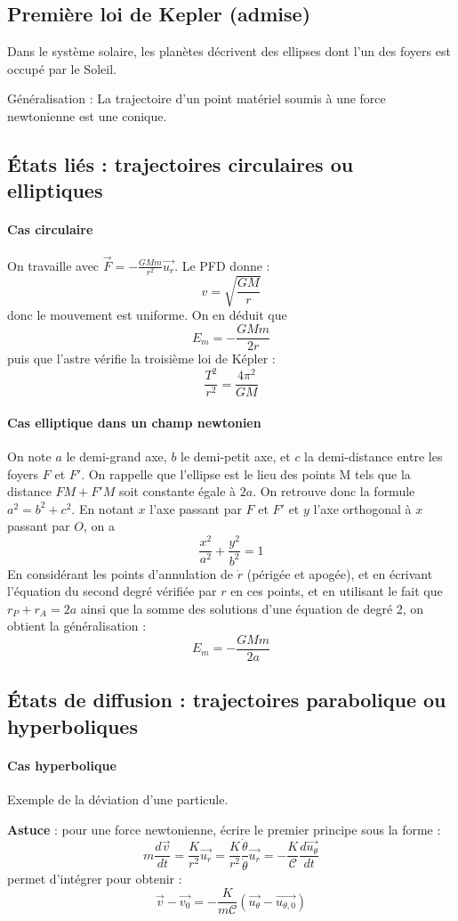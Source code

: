 \documentclass[french]{book}
\theoremstyle{plain}
\theoremstyle{definition}
\theoremstyle{remark}
\begin{document}
\subsection{Première loi de Kepler (admise)}
Dans le système solaire, les planètes décrivent des ellipses dont l'un des foyers est occupé par le Soleil. \\ \par Généralisation : La trajectoire d'un point matériel soumis à une force newtonienne est une conique.
\subsection{États liés : trajectoires circulaires ou elliptiques}
\paragraph{Cas circulaire}On travaille avec $\overrightarrow{F}=-\displaystyle\frac{GMm}{r^2}\overrightarrow{u_r}$. Le PFD donne : $$v=\sqrt{\frac{GM}{r}}$$ donc le mouvement est uniforme. On en déduit que $$E_m=-\frac{GMm}{2r}$$ puis que l'astre vérifie la troisième loi de Képler : $$\frac{T^2}{r^2}=\frac{4\pi^2}{GM}$$
\paragraph{Cas elliptique dans un champ newtonien}
On note $a$ le demi-grand axe, $b$ le demi-petit axe, et $c$ la demi-distance entre les foyers $F$ et $F'$. On rappelle que l'ellipse est le lieu des points M tels que la distance $FM+F'M$ soit constante égale à $2a$. On retrouve donc la formule $a^2=b^2+c^2$. En notant $x$ l'axe passant par $F$ et $F'$ et $y$ l'axe orthogonal à $x$ passant par $O$, on a $$\frac{x^2}{a^2}+\frac{y^2}{b^2}=1$$ En considérant les points d'annulation de $\dot{r}$ (périgée et apogée), et en écrivant l'équation du second degré vérifiée par $r$ en ces points, et en utilisant le fait que $r_P+r_A=2a$ ainsi que la somme des solutions d'une équation de degré 2, on obtient la généralisation : $$E_m=-\frac{GMm}{2a}$$
\subsection{États de diffusion : trajectoires parabolique ou hyperboliques}
\paragraph{Cas hyperbolique} Exemple de la déviation d'une particule. \\ \par \textbf{Astuce} : pour une force newtonienne, écrire le premier principe sous la forme : $$m\frac{d\overrightarrow{v}}{dt}=\frac{K}{r^2}\overrightarrow{u_r}=\frac{K}{r^2}\frac{\dot{\theta}}{\dot{\theta}}\overrightarrow{u_r}=-\frac{K}{\mathcal{C}}\frac{d\overrightarrow{u_\theta}}{dt}$$ permet d'intégrer pour obtenir : $$\overrightarrow{v}-\overrightarrow{v_0}=-\frac{K}{m\mathcal{C}}\left(\overrightarrow{u_\theta}-\overrightarrow{u_{\theta,0}}\right)$$
\end{document}
